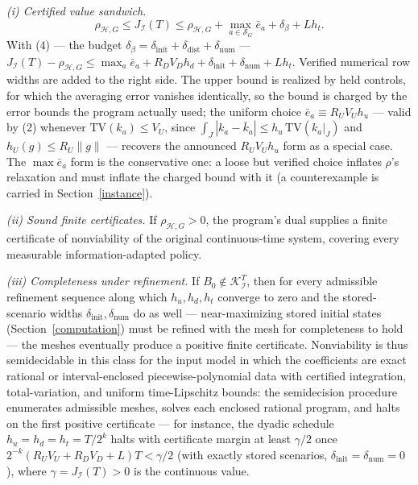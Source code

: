 \documentclass[10pt,twocolumn]{article}
\theoremstyle{plain}
\theoremstyle{definition}
\theoremstyle{remark}
\begin{document}
\noindent\emph{(i) Certified value sandwich.}
\[
\rho_{\mathcal{H},G} \le J_{\mathcal{I}}(T) \le \rho_{\mathcal{H},G}
+ \max_{a \in \mathscr{S}_G} \bar{e}_a + \delta_\beta + L h_t.
\tag{8}
\]
With (4) --- the budget \(\delta_\beta = \delta_{\mathrm{init}} +
\delta_{\mathrm{dist}} + \delta_{\mathrm{num}}\) --- \(J_{\mathcal{I}}(T) -
\rho_{\mathcal{H},G} \le \max_{a} \bar{e}_a + R_D
V_D h_d + \delta_{\mathrm{init}} + \delta_{\mathrm{num}} + L h_t\).
Verified numerical row widths are added to the right side. The upper bound
is realized by held controls, for which the averaging error vanishes
identically, so the bound is charged by the error bounds the program
actually used; the uniform choice \(\bar{e}_a \equiv R_U V_U h_u\) ---
valid by (2) whenever \(\mathrm{TV}(k_a) \le V_U\), since
\(\int_J |k_a - \bar{k}_a| \le h_u\, \mathrm{TV}(k_a|_J)\) and
\(h_U(g) \le R_U \|g\|\) --- recovers the announced
\(R_U V_U h_u\) form as a special case. The \(\max \bar{e}_a\) form is the conservative one: a loose but verified choice inflates \(\rho\)'s relaxation
and must inflate the charged bound with it (a counterexample is carried in
Section~\ref{instance}).

\noindent\emph{(ii) Sound finite certificates.} If \(\rho_{\mathcal{H},G} > 0\), the
program's dual supplies a finite certificate of nonviability of the original
continuous-time system, covering every measurable information-adapted policy.

\noindent\emph{(iii) Completeness under refinement.} If
\(B_0 \notin \mathcal{K}_{\mathcal{I}}^T\), then for every admissible
refinement sequence along which \(h_u, h_d, h_t\) converge to zero and the
stored-scenario widths \(\delta_{\mathrm{init}}, \delta_{\mathrm{num}}\)
do as well --- near-maximizing stored initial states
(Section~\ref{computation}) must be refined with the mesh for completeness
to hold --- the meshes eventually produce a positive
finite certificate. Nonviability is thus semidecidable in this class for
the input model in which the coefficients are exact rational or
interval-enclosed piecewise-polynomial data with certified integration,
total-variation, and uniform time-Lipschitz bounds: the semidecision
procedure enumerates admissible meshes, solves each enclosed rational
program, and halts on the first positive certificate --- for instance, the
dyadic schedule \(h_u = h_d = h_t = T/2^k\) halts with certificate margin
at least \(\gamma/2\) once \(2^{-k}(R_U V_U + R_D V_D + L)T < \gamma/2\)
(with exactly stored scenarios, \(\delta_{\mathrm{init}} =
\delta_{\mathrm{num}} = 0\)),
where \(\gamma = J_{\mathcal{I}}(T) > 0\) is the continuous value.
\end{document}
